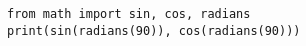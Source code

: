 %
%
\begin {lstlisting}
from math import sin, cos, radians
print(sin(radians(90)), cos(radians(90)))
\end{lstlisting}
